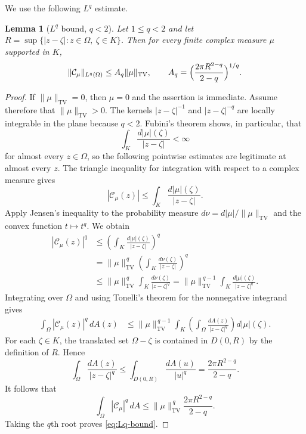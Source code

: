 \documentclass[10pt,a4paper]{amsart}
\newtheorem{lemma}[theorem]{Lemma}
\newcommand{\Cauchy}{\mathcal C}
\newcommand{\TV}{\mathrm{TV}}
\begin{document}
We use the following $L^q$ estimate.

\begin{lemma}[$L^q$ bound, $q<2$]\label{lem:Lq}
Let $1\leq q<2$ and let $R=\sup\{|z-\zeta|:z\in\Omega,\ \zeta\in K\}$.  Then for
  every finite complex measure $\mu$ supported in $K$,
\begin{equation}\label{eq:Lq-bound}
 \|\Cauchy_\mu\|_{L^q(\Omega)}
 \leq A_q\|\mu\|_{\TV},
 \qquad
 A_q=\Bigl(\frac{2\pi R^{2-q}}{2-q}\Bigr)^{1/q}.
\end{equation}
\end{lemma}

\begin{proof}
If $\|\mu\|_{\TV}=0$, then $\mu=0$ and the assertion is immediate.  Assume
therefore that $\|\mu\|_{\TV}>0$.  The kernels $|z-\zeta|^{-1}$ and $|z-\zeta|^{-q}$ are locally
integrable in the plane because $q<2$.  Fubini's theorem shows, in
particular, that
\[
 \int_K\frac{d|\mu|(\zeta)}{|z-\zeta|}<\infty
\]
for almost every $z\in\Omega$, so the following pointwise estimates are
legitimate at almost every $z$.  The triangle inequality for integration with
respect to a complex measure gives
\[
 |\Cauchy_\mu(z)|
 \leq\int_K\frac{d|\mu|(\zeta)}{|z-\zeta|}.
\]
Apply Jensen's inequality to the probability measure
$d\nu=d|\mu|/\|\mu\|_{\TV}$ and the convex function $t\mapsto t^q$.  We obtain
\begin{align*}
 |\Cauchy_\mu(z)|^q
 &\leq\left(\int_K\frac{d|\mu|(\zeta)}{|z-\zeta|}\right)^q\\
 &=\|\mu\|_{\TV}^{\,q}
   \left(\int_K\frac{d\nu(\zeta)}{|z-\zeta|}\right)^q\\
 &\leq\|\mu\|_{\TV}^{\,q}
   \int_K\frac{d\nu(\zeta)}{|z-\zeta|^q}
 =\|\mu\|_{\TV}^{\,q-1}
   \int_K\frac{d|\mu|(\zeta)}{|z-\zeta|^q}.
\end{align*}
Integrating over $\Omega$ and using Tonelli's theorem for the nonnegative
integrand gives
\begin{align*}
 \int_\Omega|\Cauchy_\mu(z)|^q\,dA(z)
 &\leq\|\mu\|_{\TV}^{\,q-1}\int_K
 \left(\int_\Omega\frac{dA(z)}{|z-\zeta|^{q}}\right)d|\mu|(\zeta).
\end{align*}
For each $\zeta\in K$, the translated set $\Omega-\zeta$ is contained in
$D(0,R)$ by the definition of $R$.  Hence
\[
 \int_\Omega\frac{dA(z)}{|z-\zeta|^{q}}
 \leq\int_{D(0,R)}\frac{dA(u)}{|u|^{q}}
 =\frac{2\pi R^{2-q}}{2-q}.
\]
It follows that
\[
 \int_\Omega|\Cauchy_\mu|^q\,dA
 \leq\|\mu\|_{\TV}^{\,q}\frac{2\pi R^{2-q}}{2-q}.
\]
Taking the $q$th root proves \eqref{eq:Lq-bound}.
\end{proof}
\end{document}
